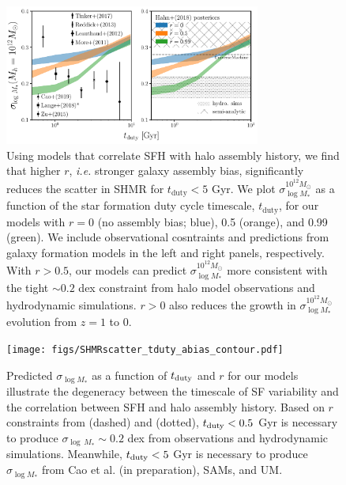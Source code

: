 \documentclass[12pt, letterpaper, preprint, tighten]{aastex62}
\newcommand{\edt}[1]{{\color{dred}{\bf} #1}}
\newcommand{\tduty}{t_{\rm duty}}
\newcommand{\siglogm}{\sigma_{\log M_*}}
\begin{document}
\begin{figure}
\begin{center}
\includegraphics[width=0.75\textwidth]{figs/SHMRscatter_tduty_abias2.pdf}
\caption{
    \edt{Using models that correlate SFH with halo assembly history, we find that 
    higher $r$, \emph{i.e.} stronger galaxy assembly bias, significantly reduces the 
    scatter in SHMR for $t_\mathrm{duty} < 5$ Gyr.} 
    We plot $\siglogm^{10^{12}M_\odot}$ as a function of the star formation
    duty cycle timescale, $t_\mathrm{duty}$, for our 
    \edt{models with $r = 0$ (no assembly bias; blue), 0.5 (orange), and 0.99 (green).
    We include observational cosntraints and predictions from galaxy formation models
    in the left and right panels, respectively. With $r > 0.5$, our models can predict 
    $\siglogm^{10^{12}M_\odot}$ more consistent with the tight $\sim0.2$ dex constraint 
    from halo model observations and hydrodynamic simulations. $r > 0$ also reduces the 
    growth in $\siglogm^{10^{12}M_\odot}$ evolution from $z = 1$ to 0.}
    }
\label{fig:sigMstar_duty_abias}
\end{center}
\end{figure}

\begin{figure}
\begin{center}
\texttt{[image: figs/SHMRscatter\_tduty\_abias\_contour.pdf]}
    \caption{
    \edt{Predicted $\siglogm$ as a function of $\tduty$ and $r$ for our
    models illustrate the degeneracy between the timescale of SF variability and
    the correlation between SFH and halo assembly history. Based on $r$ constraints
    from \cite{tinker2018b} (dashed) and \cite{behroozi2018} (dotted), $\tduty < 0.5$ Gyr
    is necessary to produce $\sigma_{\log\,M_*} \sim 0.2$ dex from observations and
    hydrodynamic simulations. Meanwhile, $\tduty < 5$ Gyr is necessary to produce
    $\siglogm$ from Cao et al. (in preparation), SAMs, and UM.}
    }
\label{fig:r_tduty}
\end{center}
\end{figure}
\end{document}
